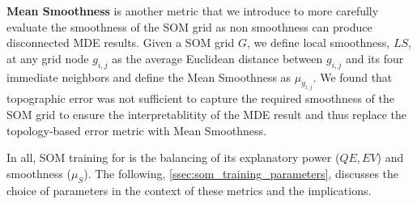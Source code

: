 
\noindent
\textbf{Mean Smoothness} is another metric that we introduce to more carefully evaluate the smoothness of the SOM grid as non smoothness can produce disconnected MDE results.
%
Given a SOM grid $G$, we define local smoothness, $LS$, at any grid node $g_{i,j}$ as the average Euclidean distance between $g_{i,j}$ and its four immediate neighbors and define the Mean Smoothness as $\mu_{g_{i,j}}$.
%
We found that topographic error was not sufficient to capture the required smoothness of the SOM grid to ensure the interpretablitity of the MDE result and thus replace the topology-based error metric with Mean Smoothness.

In all, SOM training for \ClimateSOM is the balancing of its explanatory power ($QE,EV$) and smoothness ($\mu_S$).
%
The following, \cref{ssec:som_training_parameters}, discusses the choice of parameters in the context of these metrics and the implications.


